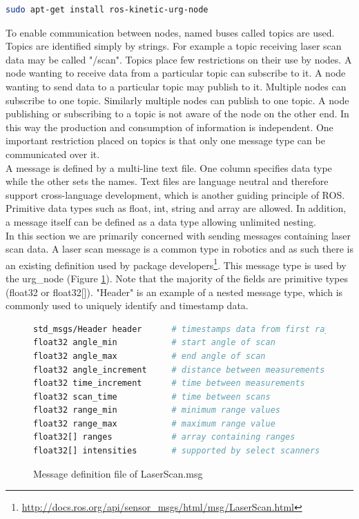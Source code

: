 \documentclass[capstone_report.tex]{subfiles}
\begin{document}
\begin{lstlisting}[language=bash]
    sudo apt-get install ros-kinetic-urg-node
\end{lstlisting}

To enable communication between nodes, named buses called topics are used.  Topics are identified simply by strings.  For example a topic receiving laser scan data may be called "/scan".  Topics place few restrictions on their use by nodes.  A node wanting to receive data from a particular topic can subscribe to it.  A node wanting to send data to a particular topic may publish to it.  Multiple nodes can subscribe to one topic.  Similarly multiple nodes can publish to one topic.  A node publishing or subscribing to a topic is not aware of the node on the other end.  In this way the production and consumption of information is independent.   One important restriction placed on topics is that only one message type can be communicated over it.\\

A message is defined by a multi-line text file.  One column specifies data type while the other sets the names.  Text files are language neutral and therefore support cross-language development, which is another guiding principle of ROS.  Primitive data types such as float, int, string and array are allowed.  In addition, a message itself can be defined as a data type allowing unlimited nesting.\\

In this section we are primarily concerned with sending messages containing laser scan data.  A laser scan message is a common type in robotics and as such there is an existing definition used by package developers\footnote{\url{http://docs.ros.org/api/sensor_msgs/html/msg/LaserScan.html}}.  This message type is used by the urg\_node (Figure \ref{fig:message}).  Note that the majority of the fields are primitive types (float32 or float32[]).  "Header" is an example of a nested message type, which is commonly used to uniquely identify and timestamp data.

\begin{figure}[H]
    \begin{lstlisting}[language=bash]
std_msgs/Header header      # timestamps data from first ray
float32 angle_min           # start angle of scan
float32 angle_max           # end angle of scan
float32 angle_increment     # distance between measurements
float32 time_increment      # time between measurements 
float32 scan_time           # time between scans
float32 range_min           # minimum range values
float32 range_max           # maximum range value
float32[] ranges            # array containing ranges
float32[] intensities       # supported by select scanners  
    \end{lstlisting}
    \caption{Message definition file of LaserScan.msg}
    \label{fig:message}
\end{figure}
\end{document}
